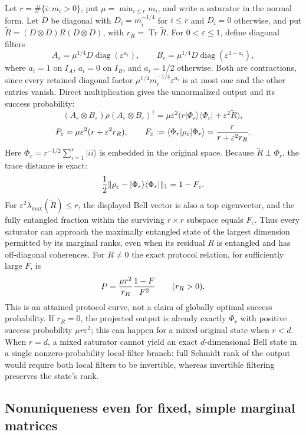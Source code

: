 Let $r=\#\{i:m_i>0\}$, put $\mu=\min_{i\le r}m_i$, and write a saturator in
the normal form. Let $D$ be diagonal with $D_i=m_i^{-1/4}$ for $i\le r$
and $D_i=0$ otherwise, and put
$\widetilde R=(D\otimes D)R(D\otimes D)$, with
$r_R=\operatorname{Tr}\widetilde R$. For $0<\varepsilon\le1$, define
diagonal filters
\[
 A_\varepsilon=\mu^{1/4}D\operatorname{diag}(\varepsilon^{a_i}),\qquad
 B_\varepsilon=\mu^{1/4}D\operatorname{diag}(\varepsilon^{1-a_i}),
\]
where $a_i=1$ on $I_A$, $a_i=0$ on $I_B$, and $a_i=1/2$ otherwise.
Both are contractions, since every retained diagonal factor
$\mu^{1/4}m_i^{-1/4}\varepsilon^{a_i}$ is at most one and the other
entries vanish. Direct multiplication
gives the unnormalized output and its success probability:
\[
 (A_\varepsilon\otimes B_\varepsilon)\rho
 (A_\varepsilon\otimes B_\varepsilon)^\dagger
 =\mu\varepsilon^2\bigl(r|\Phi_r\rangle\langle\Phi_r|
                               +\varepsilon^2\widetilde R\bigr),
\]
\[
 P_\varepsilon=\mu\varepsilon^2(r+\varepsilon^2r_R),\qquad
 F_\varepsilon:=\langle\Phi_r|\rho_\varepsilon|\Phi_r\rangle
                         ={r\over r+\varepsilon^2r_R}.
\]
Here $\Phi_r=r^{-1/2}\sum_{i=1}^r|ii\rangle$ is embedded in the original
space. Because $\widetilde R\perp\Phi_r$, the trace distance is exact:
\[
 {1\over2}\|\rho_\varepsilon-|\Phi_r\rangle\langle\Phi_r|\|_1
                =1-F_\varepsilon.
\]
For $\varepsilon^2\lambda_{\max}(\widetilde R)\le r$, the displayed Bell
vector is also a top eigenvector, and the fully entangled fraction within
the surviving $r\times r$ subspace equals $F_\varepsilon$.
Thus every saturator can approach the maximally entangled state of the
largest dimension permitted by its marginal ranks, even when its
residual $R$ is entangled and has off-diagonal coherences. For $R\ne0$ the
exact protocol relation, for sufficiently large $F$, is
\[
 P={\mu r^2\over r_R}{1-F\over F^2}\qquad(r_R>0).
\]
This is an attained protocol curve, not a claim of globally optimal success
probability. If $r_R=0$, the projected output is already exactly $\Phi_r$
with positive success probability $\mu r\varepsilon^2$; this can happen
for a mixed original state when $r<d$. When $r=d$, a mixed saturator
cannot yield an exact $d$-dimensional Bell
state in a single nonzero-probability local-filter branch: full Schmidt
rank of the output would require both local filters to be invertible,
whereas invertible filtering preserves the state's rank.

\subsection{Nonuniqueness even for fixed, simple marginal matrices}


